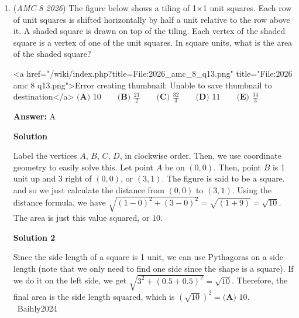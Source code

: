 \begin{enumerate}
 Look at space 3 and space 6. The numbers must sum to 4. The two numbers cannot be 2 and 2, as each digit must repeat only once, therefore the only number pair that satisfies this is 1 and 3. Now we must figure out where to place these numbers. We can now look at space 1 and space 3. If we say that space 3 is equal to 1, then space 1 must be equal to 5. That is one possible solution. Now, if we made space 3 equal to 3 instead, space 1 must be equal to 3 as well, which contradicts the problem. Therefore, the only possible solution is 5. Now, we must check and solve the rest of the triangle to make sure that there is a solution, and the answer is not E. We can now find that the final answer is $\boxed{\textbf{(D) }5}$.

 


	\item (\textit{AMC 8 2026}) The figure below shows a tiling of 1×1 unit squares. Each row of unit squares is shifted horizontally by half a unit relative to the row above it. A shaded square is drawn on top of the tiling. Each vertex of the shaded square is a vertex of one of the unit squares. In square units, what is the area of the shaded square?


 <a href="/wiki/index.php?title=File:2026\_amc\_8\_q13.png" title="File:2026 amc 8 q13.png">Error creating thumbnail: Unable to save thumbnail to destination</a>
$\textbf{(A) } 10\qquad\textbf{(B) } \frac{21}{2}\qquad\textbf{(C) } \frac{32}{3}\qquad\textbf{(D) } 11\qquad\textbf{(E) } \frac{34}{3}$

 \textbf{Answer: }A



\textbf{Solution}

Label the vertices $A$, $B$, $C$, $D$, in clockwise order. Then, we use coordinate geometry to easily solve this. Let point $A$ be on $(0, 0)$. Then, point $B$ is 1 unit up and 3 right of $(0, 0)$, or $(3, 1)$. The figure is said to be a square. and so we just calculate the distance from $(0, 0)$ to $(3,1)$. Using the distance formula, we have $\sqrt{(1-0)^2 + (3-0)^2} = \sqrt{(1+9)} = \sqrt{10}$. The area is just this value squared, or $\boxed{10}$.

 



\textbf{Solution 2}

Since the side length of a square is 1 unit, we can use Pythagoras on a side length (note that we only need to find one side since the shape is a square). If we do it on the left side, we get $\sqrt{3^2+(0.5+0.5)^2}=\sqrt{10}$. Therefore, the final area is the side length squared, which is $(\sqrt{10})^2=\boxed{\textbf{(A) }10}$. ~Baihly2024


\end{enumerate}
